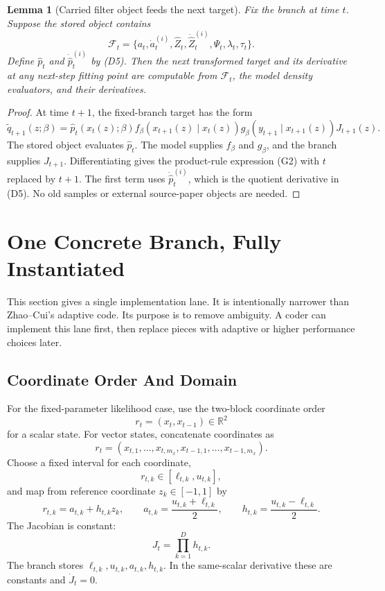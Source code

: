 \documentclass[11pt]{article}
\newtheorem{lemma}{Lemma}
\newcommand{\R}{\mathbb R}
\begin{document}
\begin{lemma}[Carried filter object feeds the next target]
Fix the branch at time \(t\).  Suppose the stored object contains
\[
    \mathcal F_t
    =
    \{a_t,\dot a_t^{(i)},\widehat Z_t,\dot{\widehat Z}_t^{(i)},
      \Psi_t,\lambda_t,\tau_t\}.
\]
Define \(\widehat p_t\) and \(\dot{\widehat p}_t^{(i)}\) by (D5).  Then the
next transformed target and its derivative at any next-step fitting point are
computable from \(\mathcal F_t\), the model density evaluators, and their
derivatives.
\end{lemma}

\begin{proof}
At time \(t+1\), the fixed-branch target has the form
\[
    \widetilde q_{t+1}(z;\beta)
    =
    \widehat p_t(x_t(z);\beta)
    f_\beta(x_{t+1}(z)\mid x_t(z))
    g_\beta(y_{t+1}\mid x_{t+1}(z))
    J_{t+1}(z).
\]
The stored object evaluates \(\widehat p_t\).  The model supplies \(f_\beta\)
and \(g_\beta\), and the branch supplies \(J_{t+1}\).  Differentiating gives
the product-rule expression (G2) with \(t\) replaced by \(t+1\).  The first
term uses \(\dot{\widehat p}_t^{(i)}\), which is the quotient derivative in
(D5).  No old samples or external source-paper objects are needed.
\end{proof}

\section{One Concrete Branch, Fully Instantiated}

This section gives a single implementation lane.  It is intentionally narrower
than Zhao--Cui's adaptive code.  Its purpose is to remove ambiguity.  A coder
can implement this lane first, then replace pieces with adaptive or higher
performance choices later.

\subsection{Coordinate Order And Domain}

For the fixed-parameter likelihood case, use the two-block coordinate order
\[
    r_t=(x_t,x_{t-1})\in\R^2
\]
for a scalar state.  For vector states, concatenate coordinates as
\[
    r_t=(x_{t,1},\ldots,x_{t,m_x},x_{t-1,1},\ldots,x_{t-1,m_x}).
\]
Choose a fixed interval for each coordinate,
\[
    r_{t,k}\in[\ell_{t,k},u_{t,k}],
\]
and map from reference coordinate \(z_k\in[-1,1]\) by
\[
    r_{t,k}=a_{t,k}+h_{t,k}z_k,\qquad
    a_{t,k}=\frac{u_{t,k}+\ell_{t,k}}2,\qquad
    h_{t,k}=\frac{u_{t,k}-\ell_{t,k}}2.
    \tag{C1}
\]
The Jacobian is constant:
\[
    J_t=\prod_{k=1}^{D}h_{t,k}.
    \tag{C2}
\]
The branch stores \(\ell_{t,k},u_{t,k},a_{t,k},h_{t,k}\).  In the same-scalar
derivative these are constants and \(\dot J_t=0\).
\end{document}
